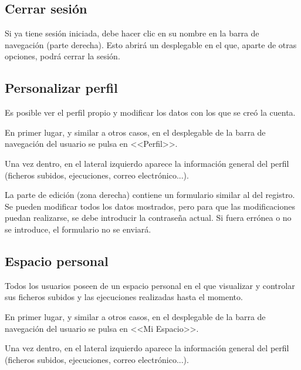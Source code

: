 \subsection{Cerrar sesión}

Si ya tiene sesión iniciada, debe hacer clic en su nombre en la barra de
navegación (parte derecha). Esto abrirá un desplegable en el que, aparte de
otras opciones, podrá cerrar la sesión.


\subsection{Personalizar perfil}

Es posible ver el perfil propio y modificar los datos con los que se creó la
cuenta.

En primer lugar, y similar a otros casos, en el desplegable de la barra de
navegación del usuario se pulsa en <<Perfil>>.


Una vez dentro, en el lateral izquierdo aparece la información general del
perfil (ficheros subidos, ejecuciones, correo electrónico...).

La parte de edición (zona derecha) contiene un formulario similar al del
registro. Se pueden modificar todos los datos mostrados, pero para que las
modificaciones puedan realizarse, se debe introducir la contraseña actual. Si
fuera errónea o no se introduce, el formulario no se enviará.

\label{mu:perfil}

\subsection{Espacio personal}

Todos los usuarios poseen de un espacio personal en el que visualizar y
controlar sus ficheros subidos y las ejecuciones realizadas hasta el momento.

En primer lugar, y similar a otros casos, en el desplegable de la barra de
navegación del usuario se pulsa en <<Mi Espacio>>.


Una vez dentro, en el lateral izquierdo aparece la información general del
perfil (ficheros subidos, ejecuciones, correo electrónico...).

